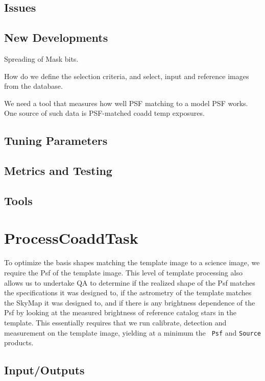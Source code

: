 \documentclass[12pt]{article}
\begin{document}
\subsection{Issues}

\subsection{New Developments}
Spreading of Mask bits.  

How do we define the selection criteria, and select, input and
reference images from the database.

We need a tool that measures how well PSF matching to a model PSF
works. One source of such data is PSF-matched coadd temp exposures.

\subsection{Tuning Parameters}

\subsection{Metrics and Testing}

\subsection{Tools}


\clearpage 
\section{ProcessCoaddTask} 

To optimize the basis shapes matching the template image to a science
image, we require the Psf of the template image.  This level of
template processing also allows us to undertake QA to determine if the
realized shape of the Psf matches the specifications it was designed
to, if the astrometry of the template matches the SkyMap it was
designed to, and if there is any brightness dependence of the Psf by
looking at the measured brightness of reference catalog stars in the
template.  This essentially requires that we run calibrate, detection
and measurement on the template image, yielding at a minimum the {\tt
  Psf} and {\tt Source} products.

\subsection{Input/Outputs}
\end{document}
